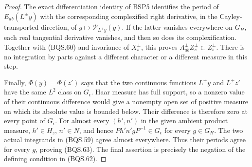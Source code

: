 \begin{proof}
The exact differentiation identity of BSP5 identifies the period
of $E_{ab}(L^\pm y)$ with the corresponding complexified right
derivative, in the Cayley-transported direction, of
$g\mapsto\mathcal P_{L^\pm y}(g)$.
If the latter vanishes everywhere on $G_H$, each real tangential
derivative vanishes, and then so does its complexification.
Together with (BQS.60) and invariance of $X_s^\pm$, this proves
$A^\pm_{ab}Z_s^\pm\subset Z_s^\pm$.
There is no integration by parts against a different character or
a different measure in this step.

Finally, $\Phi(y)=\Phi(z')$ says that the two continuous functions
$L^\pm y$ and $L^\pm z'$ have the same $L^2$ class on
$G_\epsilon$.  Haar measure has full support, so a nonzero value
of their continuous difference would give a nonempty open set
of positive measure on which its absolute value is bounded below.
Their difference is therefore zero at every point of $G_\epsilon$.
For almost every $(h',n')$ in the given ambient product measure,
$h'\in H_z$, $n'\in N$, and hence
$P h'n'gP^{-1}\in G_\epsilon$ for every $g\in G_H$.
The two actual integrands in (BQS.59) agree almost everywhere.
Thus their periods agree for every $g$, proving (BQS.63).
The final assertion is precisely the negation of the defining
condition in (BQS.62).
\end{proof}

